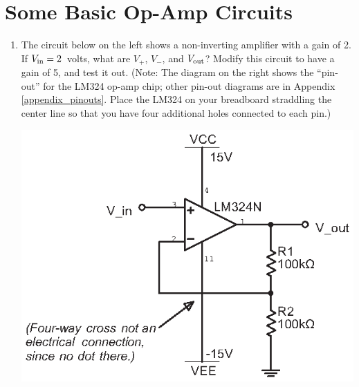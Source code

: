 \section{Some Basic Op-Amp Circuits}
\label{lab_op-amps}


\bigskip

\begin{enumerate}[wide]

\item The circuit below on the left shows a non-inverting amplifier with a gain of 2.  If $V_{\rm in} = 2$~volts, what are $V_+$, $V_-$, and $V_{\rm out}$?  Modify this circuit to have a gain of 5, and test it out. (Note: The diagram on the right shows the ``pin-out'' for the LM324 op-amp chip; other pin-out diagrams are in Appendix \ref{appendix_pinouts}.  Place the LM324 on your breadboard straddling the center line so that you have four additional holes connected to each pin.)
\begin{center}
\includegraphics{op-amps/noninverting.eps}
\hspace{0.2in}

\end{center}
\end{enumerate}
